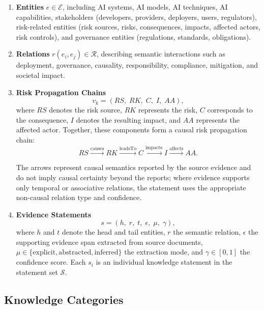\documentclass[a4paper,fleqn]{cas-dc}
\begin{document}
\begin{enumerate}
\item \textbf{Entities} $e \in \mathcal{E}$, including AI systems,
AI models, AI techniques, AI capabilities, stakeholders (developers,
providers, deployers, users, regulators), risk-related entities (risk
sources, risks, consequences, impacts, affected actors, risk
controls), and governance entities (regulations, standards,
obligations).

\item \textbf{Relations} $r(e_i, e_j) \in \mathcal{R}$, describing
semantic interactions such as deployment, governance, causality,
responsibility, compliance, mitigation, and societal impact.

\item \textbf{Risk Propagation Chains}
\begin{equation}
  v_k = (RS,\; RK,\; C,\; I,\; AA),
\end{equation}
where $RS$ denotes the risk source, $RK$ represents the risk,
$C$ corresponds to the consequence, $I$ denotes the resulting impact,
and $AA$ represents the affected actor.
Together, these components form a causal risk propagation chain:
\begin{equation}
  RS \xrightarrow{\text{causes}} RK
     \xrightarrow{\text{leadsTo}} C
     \xrightarrow{\text{impacts}} I
     \xrightarrow{\text{affects}} AA.
\end{equation}

The arrows represent causal semantics reported by the source evidence
and do not imply causal certainty beyond the reports; where evidence
supports only temporal or associative relations, the statement uses
the appropriate non-causal relation type and confidence.

\item \textbf{Evidence Statements}
\begin{equation}
  s = (h,\; r,\; t,\; \epsilon,\; \mu,\; \gamma),
\end{equation}
where $h$ and $t$ denote the head and tail entities, $r$ the semantic
relation, $\epsilon$ the supporting evidence span extracted from
source documents, $\mu \in \{\text{explicit}, \text{abstracted},
\text{inferred}\}$ the extraction mode, and $\gamma \in [0,1]$ the
confidence score. Each $s_i$ is an individual knowledge statement in
the statement set $\mathcal{S}$.

\end{enumerate}

\subsection{Knowledge Categories}
\end{document}
